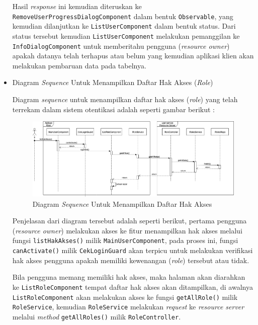 \documentclass[pdftex,12pt, oneside]{article}
\begin{document}
\begin{itemize}
	Hasil \textit{response} ini kemudian diteruskan ke \texttt{RemoveUserProgressDialogComponent} dalam bentuk \texttt{Observable}, yang kemudian dilanjutkan ke \texttt{ListUserComponent} dalam bentuk status. Dari status tersebut kemudian \texttt{ListUserComponent} melakukan pemanggilan ke \texttt{InfoDialogComponent} untuk memberitahu pengguna (\textit{resource owner}) apakah datanya telah terhapus atau belum yang kemudian aplikasi klien akan melakukan pembaruan data pada tabelnya.
	
	\item Diagram \textit{Sequence} Untuk Menampilkan Daftar Hak Akses (\textit{Role})
	
	Diagram \textit{sequence} untuk menampilkan daftar hak akses (\textit{role}) yang telah terrekam dalam sistem otentikasi adalah seperti gambar berikut :
	
	\begin{figure}[H]
		\centering
		\includegraphics[width=1\textwidth]{./resources/seq-list-role}
		\caption{Diagram \textit{Sequence} Untuk Menampilkan Daftar Hak Akses}
		\label{fig:seq-list-role}
	\end{figure}	
	
	Penjelasan dari diagram tersebut adalah seperti berikut, pertama pengguna (\textit{resource owner}) melakukan akses ke fitur menampilkan hak akses melalui fungsi \texttt{listHakAkses()} milik \texttt{MainUserComponent}, pada proses ini, fungsi \texttt{canActivate()} milik \texttt{CekLoginGuard} akan terpicu untuk melakukan verifikasi hak akses pengguna apakah memiliki kewenangan (\textit{role}) tersebut atau tidak.
	
	Bila pengguna memang memiliki hak akses, maka halaman akan diarahkan ke \texttt{ListRoleComponent} tempat daftar hak akses akan ditampilkan, di awalnya \texttt{ListRoleComponent} akan melakukan akses ke fungsi \texttt{getAllRole()} milik \texttt{RoleService}, kemudian \texttt{RoleService} melakukan \textit{request} ke \textit{resource server} melalui \textit{method} \texttt{getAllRoles()} milik \texttt{RoleController}.
	

\end{itemize}
\end{document}
